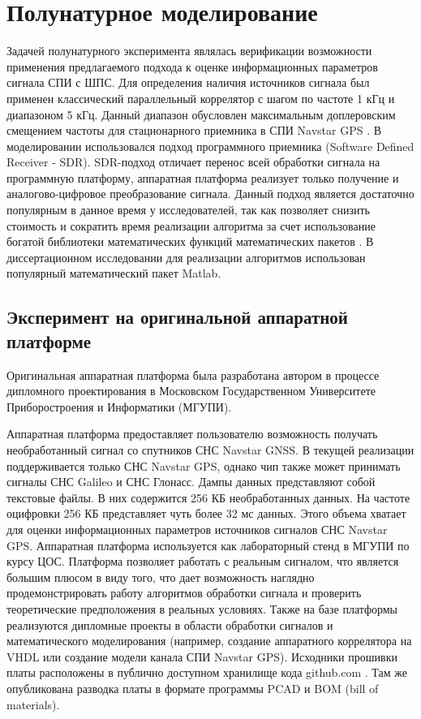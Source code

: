 \chapter{Полунатурное моделирование}
\label{ss:hw}

Задачей полунатурного эксперимента являлась верификации возможности применения предлагаемого подхода к оценке информационных параметров сигнала СПИ с ШПС. Для определения наличия источников
сигнала был применен классический параллельный коррелятор \cite{tsui} с шагом по частоте 1 кГц и диапазоном 5 кГц. Данный диапазон обусловлен максимальным доплеровским
смещением частоты для стационарного приемника в СПИ Navstar GPS \cite{shahtarin_sync, tsui}. В моделировании использовался подход программного приемника
(Software Defined Receiver - SDR). SDR-подход отличает перенос всей обработки сигнала на программную платформу, аппаратная платформа реализует только
получение и аналогово-цифровое  преобразование сигнала. Данный подход является достаточно популярным в данное время у исследователей, так как позволяет снизить стоимость и
сократить время реализации алгоритма за счет использование богатой библиотеки математических функций математических пакетов \cite{grayver-book}.
В диссертационном исследовании для реализации алгоритмов использован популярный математический пакет Matlab.

\section{Эксперимент на оригинальной аппаратной платформе}
Оригинальная аппаратная платформа была разработана автором в процессе дипломного проектирования в Московском Государственном Университете Приборостроения и Информатики (МГУПИ).

Аппаратная платформа предоставляет пользователю возможность получать необработанный сигнал со спутников СНС Navstar GNSS. В текущей реализации поддерживается только 
СНС Navstar GPS, однако чип также может принимать сигналы СНС Galileo и СНС Глонасс. Дампы данных представляют собой текстовые файлы. В них содержится 256 КБ необработанных данных.
На частоте оцифровки 256 КБ представляет чуть более 32 мс данных. Этого объема хватает для оценки информационных параметров источников сигналов СНС Navstar GPS.
Аппаратная платформа используется как лабораторный стенд в МГУПИ по курсу ЦОС. Платформа позволяет работать с реальным сигналом, что является большим плюсом в
виду того, что дает возможность наглядно продемонстрировать работу алгоритмов обработки сигнала и проверить теоретические предположения в реальных условиях.
Также на базе платформы реализуются дипломные проекты в области обработки сигналов и математического моделирования
(например, создание аппаратного коррелятора на VHDL или создание модели канала СПИ Navstar GPS).
Исходники прошивки платы расположены в публично доступном хранилище кода github.com \cite{github-gpsproject}.
Там же опубликована разводка платы в формате программы PCAD и BOM (bill of materials).


